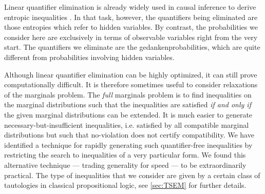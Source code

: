 {Linear quantifier elimination is already widely used in causal inference to derive entropic inequalities \cite{fritz2013marginal,chaves2014novel,chaves2014informationinference}. In that task, however, the quantifiers being eliminated are those entropies which refer to hidden variables. By contrast, the probabilities we consider here are exclusively in terms of observable variables right from the very start. The quantifiers we eliminate are the gedankenprobabilities, which are quite different from probabilities involving hidden variables.

Although linear quantifier elimination can be highly optimized, it can still prove computationally difficult. It is therefore sometimes useful to consider relaxations of the marginals problem. The \emph{full} marginals problem is to find inequalities on the marginal distributions such that the inequalities are satisfied \emph{if and only if} the given marginal distributions can be extended. It is much easier to generate necessary-but-insufficient inequalities, i.e. satisfied by all compatible marginal distributions but such that no-violation does not certify compatibility. We have identified a technique for rapidly generating such quantifier-free inequalities by restricting the search to inequalities of a very particular form. We found this alternative technique — trading generality for speed — to be extraordinarily practical. The type of inequalities that we consider are given by a certain class of tautologies in classical propositional logic, see \cref{sec:TSEM} for further details.






}
